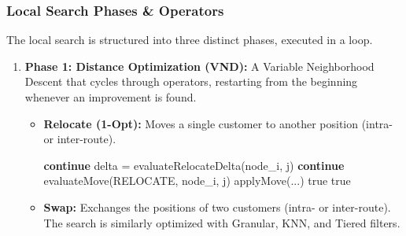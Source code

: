 \documentclass[a4paper,12pt]{article}
\begin{document}
\subsubsection{Local Search Phases & Operators}
The local search is structured into three distinct phases, executed in a loop.
\begin{enumerate}
    \item \textbf{Phase 1: Distance Optimization (VND):} A Variable Neighborhood Descent that cycles through operators, restarting from the beginning whenever an improvement is found.
    \begin{itemize}
        \item \textbf{Relocate (1-Opt):} Moves a single customer to another position (intra- or inter-route).
        \begin{algorithm}[H]
        \caption{searchRelocate(solution, context)}
        \begin{algorithmic}[1]
                \State {}
                    \State {}
                        \State {}
                         \textbf{continue} \EndIf
                        \State {}
                        \State delta = evaluateRelocateDelta(node_i, j)
                         \textbf{continue} \EndIf
                        \State {}
                        \State evaluateMove(RELOCATE, node_i, j)
                            \State applyMove(...) 
                            \State \Return true
                             
                                \State \Return true
                            \EndIf
                        \EndIf
                    \EndFor
                \EndFor
            \EndFor
        \EndForEach
        \end{algorithmic}
        \end{algorithm}
        \item \textbf{Swap:} Exchanges the positions of two customers (intra- or inter-route). The search is similarly optimized with Granular, KNN, and Tiered filters.

\end{itemize}
\end{enumerate}
\end{document}
